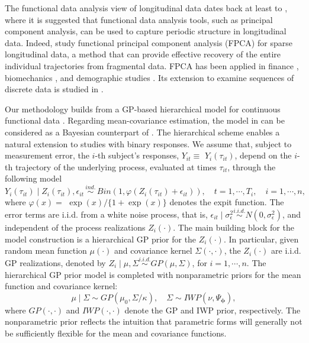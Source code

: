 The functional data analysis view of longitudinal data dates back at least to 
\citet{Zhao2004}, %
where it is suggested that functional data analysis tools, 
such as principal component analysis, can be used to capture %
periodic structure in longitudinal data. Indeed, \citet{Yao2005} study functional 
principal component analysis (FPCA) for sparse longitudinal data, a method that can 
provide effective recovery of the entire individual trajectories from fragmental data. 
FPCA has been applied in finance \citep{Ingrassia2005}, biomechanics \citep{Dona2009}, 
and demographic studies \citep{Shamshoian2020}. Its extension to examine sequences 
of discrete data is studied in \citet{Hall2008}.     


Our methodology builds from a GP-based hierarchical model for continuous functional 
data \citep{Yang2016}. Regarding mean-covariance estimation, the model in \cite{Yang2016} 
can be considered as a Bayesian counterpart of \citet{Yao2005}. 
The hierarchical scheme enables a natural extension to studies with binary responses. 
We assume that, subject to measurement error, the $i$-th subject's responses, 
$Y_{it} \equiv$ $Y_i(\tau_{it})$, depend on the $i$-th trajectory of the underlying 
process, evaluated at times $\tau_{it}$, through the following model
\begin{equation*}
Y_i(\tau_{it}) \mid Z_i(\tau_{it}),\epsilon_{it} \, \stackrel{ind.}{\sim} \,
Bin(1, \varphi(Z_i(\tau_{it})+\epsilon_{it})),\quad t=1,\cdots,T_i,\quad i=1,\cdots,n,
\label{eq:bernmodel}
\end{equation*}
where $\varphi(x) = $ $\exp(x)/\{ 1 + \exp(x) \}$ denotes the expit function. 
The error terms are i.i.d. from a white noise process, that is, 
$\epsilon_{it} \mid \sigma^2_{\epsilon} \stackrel{i.i.d.}{\sim} N(0,\sigma^2_{\epsilon})$, 
and independent of the process realizations $Z_i(\cdot)$. The main building block 
for the model construction is a hierarchical GP prior for the $Z_i(\cdot)$.
In particular, given random mean function $\mu(\cdot)$ and covariance kernel 
$\Sigma(\cdot,\cdot)$, the $Z_i(\cdot)$ are i.i.d. GP realizations, denoted by 
$Z_i \mid \mu,\Sigma \stackrel{i.i.d.}{\sim} GP(\mu,\Sigma)$, for $i=1,\cdots,n$.
The hierarchical GP prior model is completed with nonparametric priors for the 
mean function and covariance kernel:
\begin{equation}
\mu \mid \Sigma \sim GP(\mu_0,\Sigma/\kappa), \quad 
\Sigma\sim IWP(\nu,\Psi_{\boldsymbol{\phi}}) ,
\label{eq:gpiwpprior}
\end{equation}
where $GP(\cdot,\cdot)$ and $IWP(\cdot,\cdot)$ denote the GP and IWP prior, 
respectively. The nonparametric prior reflects the intuition that parametric forms 
will generally not be sufficiently flexible for the mean and covariance functions.



